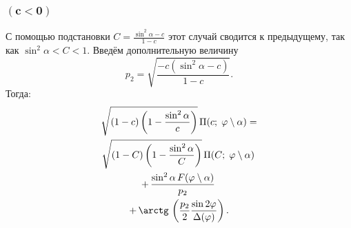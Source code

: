 \documentclass[fleqn]{article}
\begin{document}
	\subsubsection{$\mathbf{(c<0)}$}
	С помощью подстановки $C = \frac{\sin^2\alpha-c}{1-c}$ этот случай сводится к предыдущему, так как $\sin^2\alpha < C < 1.$ Введём дополнительную величину
	\begin{equation*}p_2=\sqrt{\frac{ -c(\sin^2\alpha-c)}{1-c}}.\end{equation*}
	Тогда:
	\begin{multline*}{
			\sqrt {(1-c)\left(1-{\frac {\sin ^{2}\alpha }{c}}\right)}}\,\Pi (c;\;\varphi \setminus \alpha )=
		\\ {\sqrt {(1-C)\left(1-{\frac {\sin ^{2}\alpha }{C}}\right)}}\,\Pi (C;\;\varphi \setminus \alpha )\,
		\\ +\,{\frac {\sin ^{2}\alpha \,F(\varphi \setminus \alpha )}{p_{2}}}\,
		\\ +\, \arctg \,\left({\frac {p_{2}}{2}}{\frac {\sin {2\varphi }}{\Delta (\varphi )}}\right).
		\\ \end{multline*}
\end{document}
